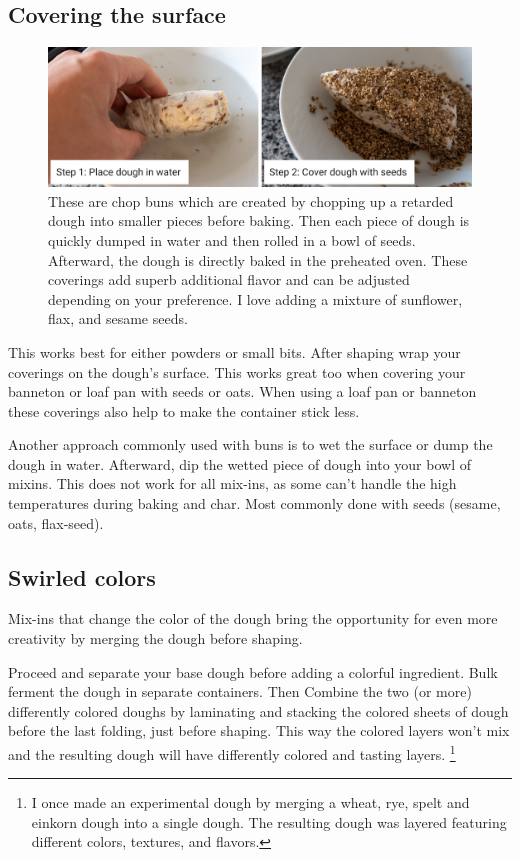 \subsection{Covering the surface}

\begin{figure}[htb!]
  \includegraphics[width=\textwidth]{surface-seeds}
  \caption[Surface seeds]{These are chop buns which are created by chopping
    up a retarded dough into smaller pieces before baking. Then each piece of
    dough is quickly dumped in water and then rolled in a bowl of seeds.
    Afterward, the dough is directly baked in the preheated oven. These
    coverings add superb additional flavor and can be adjusted depending on
    your preference. I love adding a mixture of sunflower, flax, and
    sesame seeds.}%
\end{figure}

This works best for either powders or small bits. After shaping wrap your
coverings on the dough's surface. This works great too when covering your
banneton or loaf pan with seeds or oats. When using a loaf pan or banneton
these coverings also help to make the container stick less.

Another approach commonly used with buns is to wet the surface or dump the
dough in water. Afterward, dip the wetted piece of dough into your bowl of
mixins.  This does not work for all mix-ins, as some can't handle the high temperatures
during baking and char. Most commonly done with seeds (\eg sesame, oats, flax-seed).

\subsection{Swirled colors}
Mix-ins that change the color of the dough bring the opportunity for even more
creativity by merging the dough before shaping.

Proceed and separate your base dough before adding a colorful ingredient. Bulk
ferment the dough in separate containers. Then Combine the two (or
more) differently colored doughs by laminating and stacking the colored sheets
of dough before the last folding, just before shaping. This way the colored
layers won't mix and the resulting dough will have differently colored and
tasting layers. \footnote{I once made an experimental dough by merging a wheat,
rye, spelt and einkorn dough into a single dough. The resulting dough was
layered featuring different colors, textures, and flavors.}

